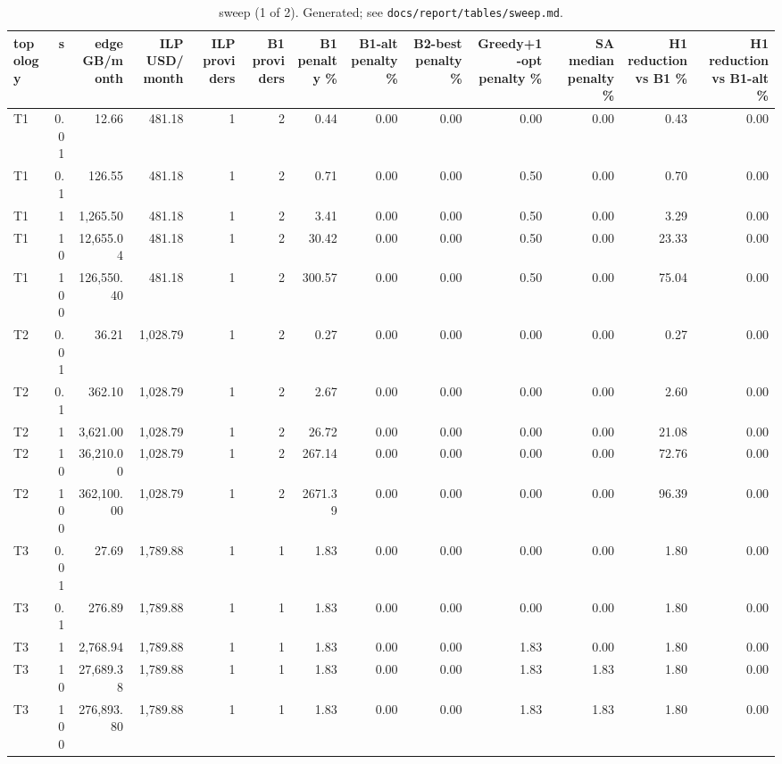 \begin{table}[t]
\centering
\small
\begin{tabular}{lrrrrrrrrrrrr}
\toprule
topology & s & edge GB/month & ILP USD/month & ILP providers & B1 providers & B1 penalty \% & B1-alt penalty \% & B2-best penalty \% & Greedy+1-opt penalty \% & SA median penalty \% & H1 reduction vs B1 \% & H1 reduction vs B1-alt \% \\
\midrule
T1 & 0.01 & 12.66 & 481.18 & 1 & 2 & 0.44 & 0.00 & 0.00 & 0.00 & 0.00 & 0.43 & 0.00 \\
T1 & 0.1 & 126.55 & 481.18 & 1 & 2 & 0.71 & 0.00 & 0.00 & 0.50 & 0.00 & 0.70 & 0.00 \\
T1 & 1 & 1,265.50 & 481.18 & 1 & 2 & 3.41 & 0.00 & 0.00 & 0.50 & 0.00 & 3.29 & 0.00 \\
T1 & 10 & 12,655.04 & 481.18 & 1 & 2 & 30.42 & 0.00 & 0.00 & 0.50 & 0.00 & 23.33 & 0.00 \\
T1 & 100 & 126,550.40 & 481.18 & 1 & 2 & 300.57 & 0.00 & 0.00 & 0.50 & 0.00 & 75.04 & 0.00 \\
T2 & 0.01 & 36.21 & 1,028.79 & 1 & 2 & 0.27 & 0.00 & 0.00 & 0.00 & 0.00 & 0.27 & 0.00 \\
T2 & 0.1 & 362.10 & 1,028.79 & 1 & 2 & 2.67 & 0.00 & 0.00 & 0.00 & 0.00 & 2.60 & 0.00 \\
T2 & 1 & 3,621.00 & 1,028.79 & 1 & 2 & 26.72 & 0.00 & 0.00 & 0.00 & 0.00 & 21.08 & 0.00 \\
T2 & 10 & 36,210.00 & 1,028.79 & 1 & 2 & 267.14 & 0.00 & 0.00 & 0.00 & 0.00 & 72.76 & 0.00 \\
T2 & 100 & 362,100.00 & 1,028.79 & 1 & 2 & 2671.39 & 0.00 & 0.00 & 0.00 & 0.00 & 96.39 & 0.00 \\
T3 & 0.01 & 27.69 & 1,789.88 & 1 & 1 & 1.83 & 0.00 & 0.00 & 0.00 & 0.00 & 1.80 & 0.00 \\
T3 & 0.1 & 276.89 & 1,789.88 & 1 & 1 & 1.83 & 0.00 & 0.00 & 0.00 & 0.00 & 1.80 & 0.00 \\
T3 & 1 & 2,768.94 & 1,789.88 & 1 & 1 & 1.83 & 0.00 & 0.00 & 1.83 & 0.00 & 1.80 & 0.00 \\
T3 & 10 & 27,689.38 & 1,789.88 & 1 & 1 & 1.83 & 0.00 & 0.00 & 1.83 & 1.83 & 1.80 & 0.00 \\
T3 & 100 & 276,893.80 & 1,789.88 & 1 & 1 & 1.83 & 0.00 & 0.00 & 1.83 & 1.83 & 1.80 & 0.00 \\
\bottomrule
\end{tabular}
\caption{sweep (1 of 2). Generated; see \texttt{docs/report/tables/sweep.md}.}
\label{tab:sweep-1}
\end{table}

